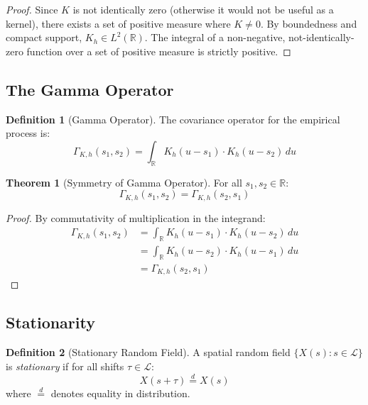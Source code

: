 \documentclass[11pt,a4paper]{article}
\theoremstyle{definition}
\newtheorem{definition}{Definition}[section]
\newtheorem{theorem}{Theorem}[section]
\begin{document}
\begin{proof}
Since $K$ is not identically zero (otherwise it would not be useful as a kernel), there exists a set of positive measure where $K \neq 0$. By boundedness and compact support, $K_h \in L^2(\mathbb{R})$. The integral of a non-negative, not-identically-zero function over a set of positive measure is strictly positive.
\end{proof}

\subsection{The Gamma Operator}

\begin{definition}[Gamma Operator]
The covariance operator for the empirical process is:
\begin{equation}
\Gamma_{K,h}(s_1, s_2) = \int_{\mathbb{R}} K_h(u - s_1) \cdot K_h(u - s_2) \, du
\end{equation}
\end{definition}

\begin{theorem}[Symmetry of Gamma Operator]
For all $s_1, s_2 \in \mathbb{R}$:
\begin{equation}
\Gamma_{K,h}(s_1, s_2) = \Gamma_{K,h}(s_2, s_1)
\end{equation}
\end{theorem}

\begin{proof}
By commutativity of multiplication in the integrand:
\begin{align}
\Gamma_{K,h}(s_1, s_2) &= \int_{\mathbb{R}} K_h(u - s_1) \cdot K_h(u - s_2) \, du \\
&= \int_{\mathbb{R}} K_h(u - s_2) \cdot K_h(u - s_1) \, du \\
&= \Gamma_{K,h}(s_2, s_1)
\end{align}
\end{proof}

\subsection{Stationarity}

\begin{definition}[Stationary Random Field]
A spatial random field $\{X(s) : s \in \mathcal{L}\}$ is \emph{stationary} if for all shifts $\tau \in \mathcal{L}$:
\begin{equation}
X(s + \tau) \stackrel{d}{=} X(s)
\end{equation}
where $\stackrel{d}{=}$ denotes equality in distribution.
\end{definition}
\end{document}
